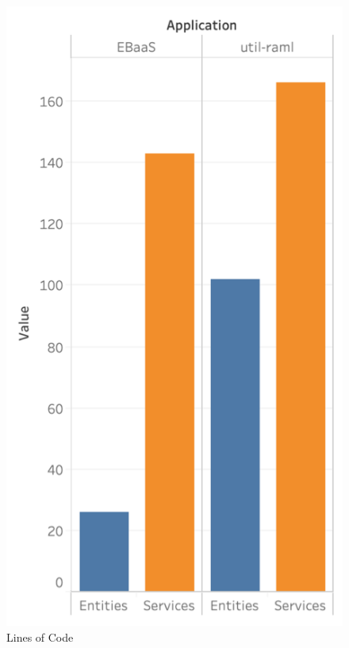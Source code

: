 \documentclass[letterpaper, 10 pt, conference]{ieeeconf}
\begin{document}
\begin{itemize}
\begin{figure}[h]
   \centering
   \includegraphics[scale=0.33]{./LinesOfCode.png}
   \caption{Lines of Code}
   \label{fig:my_label}
\end{figure}


\end{itemize}
\end{document}
